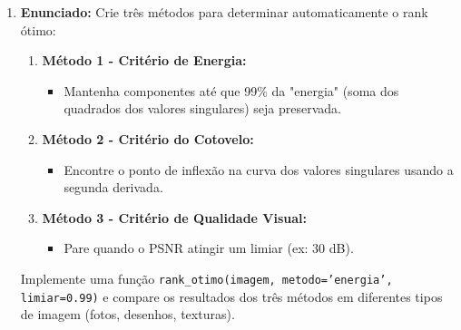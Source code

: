 \documentclass[a4paper,12pt]{article}
\begin{document}
\begin{enumerate}
    \item \textbf{Enunciado:}
    Crie três métodos para determinar automaticamente o rank ótimo:
    \begin{enumerate}
        \item \textbf{Método 1 - Critério de Energia:}
        \begin{itemize}
            \item Mantenha componentes até que 99\% da "energia" (soma dos quadrados dos valores singulares) seja preservada.
        \end{itemize}
        \item \textbf{Método 2 - Critério do Cotovelo:}
        \begin{itemize}
            \item Encontre o ponto de inflexão na curva dos valores singulares usando a segunda derivada.
        \end{itemize}
        \item \textbf{Método 3 - Critério de Qualidade Visual:}
        \begin{itemize}
            \item Pare quando o PSNR atingir um limiar (ex: 30 dB).
        \end{itemize}
    \end{enumerate}
    Implemente uma função \texttt{rank\_otimo(imagem, metodo='energia', limiar=0.99)} e compare os resultados dos três métodos em diferentes tipos de imagem (fotos, desenhos, texturas).


\end{enumerate}
\end{document}
